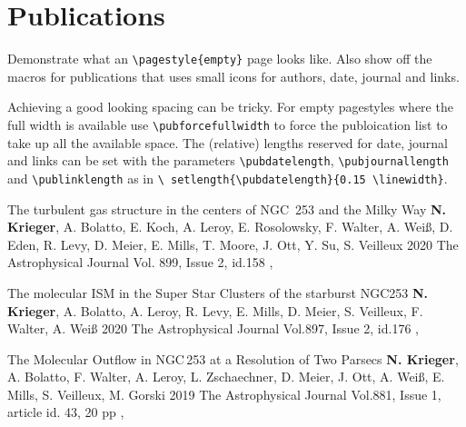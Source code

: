 \section{Publications}
\pubforcefullwidth

Demonstrate what an \texttt{\textbackslash pagestyle\{empty\}} page looks like.
Also show off the macros for publications that uses small icons for authors,
date, journal and links.

Achieving a good looking spacing can be tricky. For empty pagestyles where the
full width is available use \texttt{\textbackslash pubforcefullwidth} to force
the publoication list to take up all the available space. The (relative)
lengths reserved for date, journal and links can be set with the parameters
\texttt{\textbackslash pubdatelength}, \texttt{\textbackslash pubjournallength}
and \texttt{\textbackslash publinklength} as in \texttt{\textbackslash
setlength\{\textbackslash pubdatelength\}\{0.15 \textbackslash linewidth\}}.
\bigskip

\publication
	{The turbulent gas structure in the centers of NGC~253 and the Milky Way}
  {\textbf{N. Krieger}, A. Bolatto, E. Koch, A. Leroy, E. Rosolowsky, F.
    Walter, A. Wei\ss, D. Eden, R. Levy, D. Meier, E. Mills, T. Moore, J. Ott, Y.
    Su, S. Veilleux}
	{2020}
  {The Astrophysical Journal Vol. 899, Issue 2, id.158}
  {,
    }

\publication
  {The molecular ISM in the Super Star Clusters of the starburst NGC253}
  {\textbf{N. Krieger}, A. Bolatto, A. Leroy, R. Levy, E. Mills, D. Meier, S.
    Veilleux, F. Walter, A. Wei\ss}
	{2020}
  {The Astrophysical Journal Vol.897, Issue 2, id.176}
  {,
    }

\publication
	{The Molecular Outflow in NGC\,253 at a Resolution of Two Parsecs}
  {\textbf{N. Krieger}, A. Bolatto, F. Walter, A. Leroy, L. Zschaechner, D.
    Meier, J. Ott, A. Wei\ss, E. Mills, S. Veilleux, M. Gorski}
	{2019}
	{The Astrophysical Journal Vol.881, Issue 1, article id. 43, 20 pp}
  {,
    }
